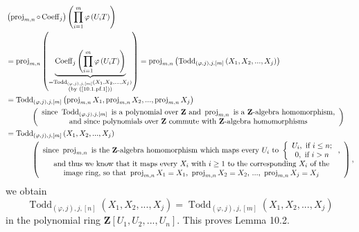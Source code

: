 \documentclass[numbers=enddot,12pt,final,onecolumn,notitlepage]{scrartcl}%
\begin{document}
\begin{align*}
&  \left(  \operatorname*{proj}\nolimits_{m,n}\circ\operatorname*{Coeff}%
\nolimits_{j}\right)  \left(  \prod\limits_{i=1}^{m}\varphi\left(
U_{i}T\right)  \right) \\
&  =\operatorname*{proj}\nolimits_{m,n}\left(
\underbrace{\operatorname*{Coeff}\nolimits_{j}\left(  \prod\limits_{i=1}%
^{m}\varphi\left(  U_{i}T\right)  \right)  }_{\substack{=\operatorname*{Todd}%
\nolimits_{\left(  \varphi,j\right)  ,j,\left[  m\right]  }\left(  X_{1}%
,X_{2},...,X_{j}\right)  \\\text{(by (\ref{10.1.pf.1}))}}}\right)
=\operatorname*{proj}\nolimits_{m,n}\left(  \operatorname*{Todd}%
\nolimits_{\left(  \varphi,j\right)  ,j,\left[  m\right]  }\left(  X_{1}%
,X_{2},...,X_{j}\right)  \right) \\
&  =\operatorname*{Todd}\nolimits_{\left(  \varphi,j\right)  ,j,\left[
m\right]  }\left(  \operatorname*{proj}\nolimits_{m,n}X_{1}%
,\operatorname*{proj}\nolimits_{m,n}X_{2},...,\operatorname*{proj}%
\nolimits_{m,n}X_{j}\right) \\
&  \ \ \ \ \ \ \ \ \ \ \left(
\begin{array}
[c]{c}%
\text{since }\operatorname*{Todd}\nolimits_{\left(  \varphi,j\right)
,j,\left[  m\right]  }\text{ is a polynomial over }\mathbf{Z}\text{ and
}\operatorname*{proj}\nolimits_{m,n}\text{ is a }\mathbf{Z}\text{-algebra
homomorphism,}\\
\text{and since polynomials over }\mathbf{Z}\text{ commute with }%
\mathbf{Z}\text{-algebra homomorphisms}%
\end{array}
\right) \\
&  =\operatorname*{Todd}\nolimits_{\left(  \varphi,j\right)  ,j,\left[
m\right]  }\left(  X_{1},X_{2},...,X_{j}\right) \\
&  \ \ \ \ \ \ \ \ \ \ \left(
\begin{array}
[c]{c}%
\text{since }\operatorname*{proj}\nolimits_{m,n}\text{ is the }\mathbf{Z}%
\text{-algebra homomorphism which maps every }U_{i}\text{ to }\left\{
\begin{array}
[c]{c}%
U_{i},\text{ if }i\leq n;\\
0,\text{ if }i>n
\end{array}
\right.  \text{,}\\
\text{and thus we know that it maps every }X_{i}\text{ with }i\geq1\text{ to
the corresponding }X_{i}\text{ of the}\\
\text{image ring, so that }\operatorname*{proj}\nolimits_{m,n}X_{1}%
=X_{1}\text{, }\operatorname*{proj}\nolimits_{m,n}X_{2}=X_{2}\text{,
}...\text{, }\operatorname*{proj}\nolimits_{m,n}X_{j}=X_{j}%
\end{array}
\right)  ,
\end{align*}
we obtain%
\[
\operatorname*{Todd}\nolimits_{\left(  \varphi,j\right)  ,j,\left[  n\right]
}\left(  X_{1},X_{2},...,X_{j}\right)  =\operatorname*{Todd}\nolimits_{\left(
\varphi,j\right)  ,j,\left[  m\right]  }\left(  X_{1},X_{2},...,X_{j}\right)
\]
in the polynomial ring $\mathbf{Z}\left[  U_{1},U_{2},...,U_{n}\right]  $.
This proves Lemma 10.2.
\end{document}
